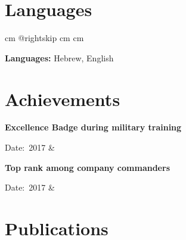 \documentclass[10pt, letterpaper]{article}
\let\originalTabularx\tabularx
\let\originalEndTabularx\endtabularx
\renewenvironment{tabularx}{\bgroup\centering\originalTabularx}{\originalEndTabularx\par\egroup}
\begin{document}
    
    \section{Languages}

        \begingroup{} cm
        \advance\csname @rightskip cm
        \advance{} cm

        \textbf{Languages:} Hebrew, English \par\endgroup


    
    \section{Achievements}

        \begin{tabularx}{\textwidth-0.4 cm-0.13cm}{K{0.2 cm} R{4.1 cm}}
            
            \textbf{Excellence Badge during military training}

            \vspace{0.10 cm}

            \mbox{Date: 2017}
            &
            
            
        \end{tabularx}

        \vspace{0.2 cm}
        \begin{tabularx}{\textwidth-0.4 cm-0.13cm}{K{0.2 cm} R{4.1 cm}}
            
            \textbf{Top rank among company commanders}

            \vspace{0.10 cm}

            \mbox{Date: 2017}
            &
            
            
        \end{tabularx}


    
    \section{Publications}

\end{document}
